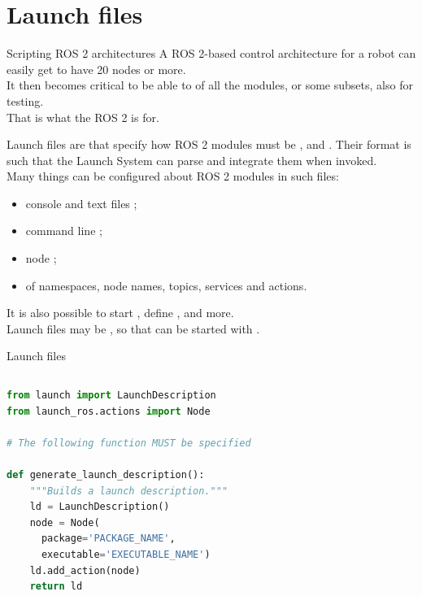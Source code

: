 
\section{Launch files}

\begin{frame}{Scripting ROS 2 architectures}
  \justifying
	A ROS 2-based control architecture for a robot can easily get to have 20 nodes or more.\\
	\bigskip
	It then becomes critical to be able to  of all the modules, or some subsets, also for testing.\\
	\bigskip
	That is what the ROS 2  is for.
\end{frame}

\begin{frame}{Launch files}
  \justifying
	 are  that specify how ROS 2 modules must be ,  and . Their format is such that the Launch System can parse and integrate them when invoked.\\
  \bigskip
	Many things can be configured about ROS 2 modules in such files:
	\begin{itemize}
		\item console and text files ;
		\item command line ;
		\item node ;
		\item {} of namespaces, node names, topics, services and actions.
	\end{itemize}
	\bigskip
	It is also possible to start , define , and more.\\
  \bigskip
	Launch files may be , so that  can be started with .
\end{frame}
\begin{frame}[fragile]{Launch files}
	\begin{columns}
		\begin{lstlisting}[language=Python, caption=Minimal example of a launch file that starts a ROS 2 node.]
from launch import LaunchDescription
from launch_ros.actions import Node

# The following function MUST be specified

def generate_launch_description():
    """Builds a launch description."""
    ld = LaunchDescription()
    node = Node(
      package='PACKAGE_NAME',
      executable='EXECUTABLE_NAME')
    ld.add_action(node)
    return ld
\end{lstlisting}
	\end{columns}
\end{frame}

